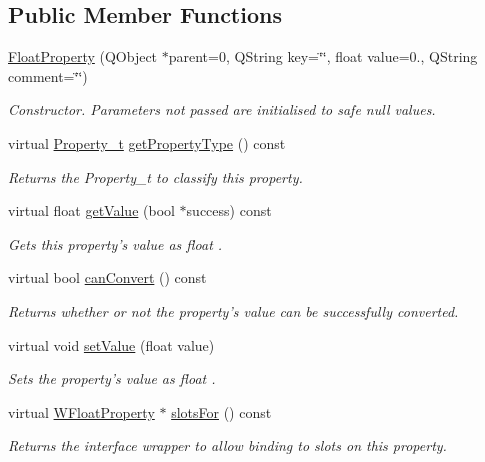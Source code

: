\subsection*{Public Member Functions}
\begin{DoxyCompactItemize}
\item 
\hyperlink{class_float_property_a94120bb05019e3cfc064b8ef7ab86e00}{Float\-Property} (Q\-Object $\ast$parent=0, Q\-String key=\char`\"{}\char`\"{}, float value=0., Q\-String comment=\char`\"{}\char`\"{})
\begin{DoxyCompactList}\small\item\em Constructor. Parameters not passed are initialised to safe null values. \end{DoxyCompactList}\item 
virtual \hyperlink{group___property_classes_ga38f1ccddda12c7cb50b868c9f789ee37}{Property\-\_\-t} \hyperlink{class_float_property_ac224ce3448cbe08d9c1b28804233086b}{get\-Property\-Type} () const 
\begin{DoxyCompactList}\small\item\em Returns the Property\-\_\-t to classify this property. \end{DoxyCompactList}\item 
virtual float \hyperlink{class_float_property_a91854af44926b14c2264d16d71c06f11}{get\-Value} (bool $\ast$success) const 
\begin{DoxyCompactList}\small\item\em Gets this property's value as float . \end{DoxyCompactList}\item 
virtual bool \hyperlink{class_float_property_a38c95c8f0a4131f5fd8a4a09352ba984}{can\-Convert} () const 
\begin{DoxyCompactList}\small\item\em Returns whether or not the property's value can be successfully converted. \end{DoxyCompactList}\item 
virtual void \hyperlink{class_float_property_a24ef985394b6273da923cf0165620568}{set\-Value} (float value)
\begin{DoxyCompactList}\small\item\em Sets the property's value as float . \end{DoxyCompactList}\item 
virtual \hyperlink{class_w_float_property}{W\-Float\-Property} $\ast$ \hyperlink{class_float_property_aa8f23ba9718273d96802b051d510b087}{slots\-For} () const 
\begin{DoxyCompactList}\small\item\em Returns the interface wrapper to allow binding to slots on this property. \end{DoxyCompactList}\end{DoxyCompactItemize}
